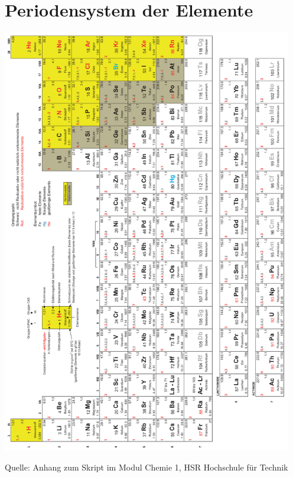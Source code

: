 \documentclass[9pt, openright=false]{scrartcl}
\begin{document}
\section{Periodensystem der Elemente}
\begin{center}
\includegraphics[width=0.95\textwidth]{images/periodensystem}
\end{center}
\begin{small}
Quelle: Anhang zum Skript im Modul Chemie 1, HSR Hochschule für Technik
\end{small}
\clearpage
\renewcommand{\indexname}{Stichwortverzeichnis}
\printindex
\end{document}
